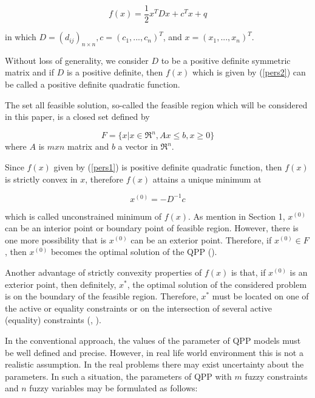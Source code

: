\documentclass{iaesarticle3}
\begin{document}
\begin{equation}\label{pers2}
    f(x) = \frac{1}{2} x^TDx + c^Tx + q
\end{equation}

in which $D = (d_{ij})_{n \times n}, c = (c_1,..., c_n)^T$, and $x = (x_1,..., x_n)^T$.

Without loss of generality, we consider $D$ to be a positive definite symmetric matrix and if $D$ is a positive definite, then $f(x)$ which is given by (\ref{pers2}) can be called a positive definite quadratic function.

The set all feasible solution, so-called the feasible region which will be considered in this paper, is a closed set defined by

\begin{equation}\label{pers3}
    F = \{x|x \in \Re^n, Ax \leq b, x \geq 0 \}
\end{equation}
where $A$ is $mxn$ matrix and $b$ a vector in $\Re^n$.

Since $f(x)$ given by (\ref{pers1}) is positive definite quadratic function, then $f(x)$ is strictly convex in $x$, therefore $f(x)$ attains a unique minimum at

\begin{equation}\label{pers4}
    x^{(0)} = -D^{-1}c
\end{equation}

which is called unconstrained minimum of $f(x)$. As mention in Section 1, $x^{(0)}$ can be an interior point or boundary point of feasible region. However, there is one more possibility that is $x^{(0)}$ can be an exterior point. Therefore, if $x^{(0)} \in F$, then $x^{(0)}$ becomes the optimal solution of the QPP (\cite{iby}).

Another advantage of strictly convexity properties of $f(x)$ is that, if $x^{(0)}$ is an exterior point, then definitely, $x^*$, the optimal solution of the considered problem is on the boundary of the feasible region. Therefore, $x^*$ must be located on one of the active or equality constraints or on the intersection of several active (equality) constraints (\cite{ism}, \cite{isy}).

In the conventional approach, the values of the parameter of QPP models must be well defined and precise. However, in real life world environment this is not a realistic assumption. In the real problems there may exist uncertainty about the parameters. In such a situation, the parameters of QPP with $m$ fuzzy constraints and $n$ fuzzy variables may be formulated as follows:
\end{document}
